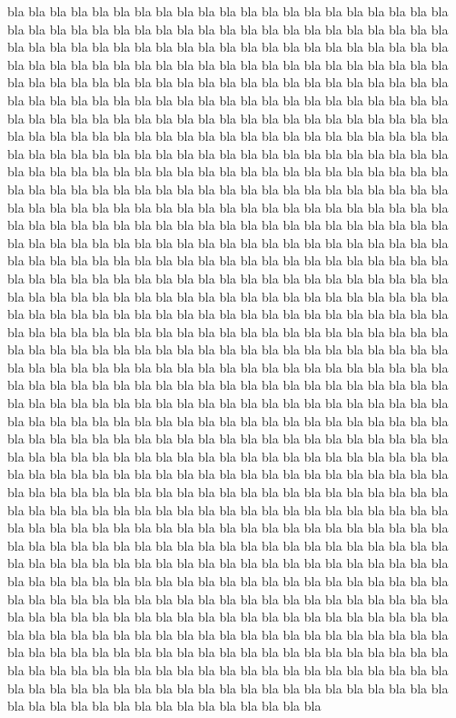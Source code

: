 \documentclass[12pt]{book}%
\theoremstyle{newstyle}%
\begin{document}
bla bla bla bla bla bla bla bla bla bla bla bla bla bla bla bla bla bla bla bla bla bla bla bla bla bla bla bla bla bla bla bla bla bla bla bla bla bla bla bla bla bla bla bla bla bla bla bla bla bla bla bla bla bla bla bla bla bla bla bla bla bla bla bla bla bla bla bla bla bla bla bla bla bla bla bla bla bla bla bla bla bla bla bla bla bla bla bla bla bla bla bla bla bla bla bla bla bla bla bla bla bla bla bla bla bla bla bla bla bla bla bla bla bla bla bla bla bla bla bla bla bla bla bla bla bla bla bla bla bla bla bla bla bla bla bla bla bla bla bla bla bla bla bla bla bla bla bla bla bla bla bla bla bla bla bla bla bla bla bla bla bla bla bla bla bla bla bla bla bla bla bla bla bla bla bla bla bla bla bla bla bla bla bla bla bla bla bla bla bla bla bla bla bla bla bla bla bla bla bla bla bla bla bla bla bla bla bla bla bla bla bla bla bla bla bla bla bla bla bla bla bla bla bla bla bla bla bla bla bla bla bla bla bla bla bla bla bla bla bla bla bla bla bla bla bla bla bla bla bla bla bla bla bla bla bla bla bla bla bla bla bla bla bla bla bla bla bla bla bla bla bla bla bla bla bla bla bla bla bla bla bla bla bla bla bla bla bla bla bla bla bla bla bla bla bla bla bla bla bla bla bla bla bla bla bla bla bla bla bla bla bla bla bla bla bla bla bla bla bla bla bla bla bla bla bla bla bla bla bla bla bla bla bla bla bla bla bla bla bla bla bla bla bla bla bla bla bla bla bla bla bla bla bla bla bla bla bla bla bla bla bla bla bla bla bla bla bla bla bla bla bla bla bla bla bla bla bla bla bla bla bla bla bla bla bla bla bla bla bla bla bla bla bla bla bla bla bla bla bla bla bla bla bla bla bla bla bla bla bla bla bla bla bla bla bla bla bla bla bla bla bla bla bla bla bla bla bla bla bla bla bla bla bla bla bla bla bla bla bla bla bla bla bla bla bla bla bla bla bla bla bla bla bla bla bla bla bla bla bla bla bla bla bla bla bla bla bla bla bla bla bla bla bla bla bla bla bla bla bla bla bla bla bla bla bla bla bla bla bla bla bla bla bla bla bla bla bla bla bla bla bla bla bla bla bla bla bla bla bla bla bla bla bla bla bla bla bla bla bla bla bla bla bla bla bla bla bla bla bla bla bla bla bla bla bla bla bla bla bla bla bla bla bla bla bla bla bla bla bla bla bla bla bla bla bla bla bla bla bla bla bla bla bla bla bla bla bla bla bla bla bla bla bla bla bla bla bla bla bla bla bla bla bla bla bla bla bla bla bla bla bla bla bla bla bla bla bla bla bla bla bla bla bla bla bla bla bla bla bla bla bla bla bla bla bla bla bla bla bla bla bla bla bla bla bla bla bla bla bla bla bla bla bla bla bla bla bla bla bla bla bla bla bla bla bla bla bla bla bla bla bla bla bla bla bla bla bla bla bla bla bla bla bla bla bla bla bla bla bla bla bla bla bla bla bla bla bla bla bla bla bla bla bla bla bla bla bla bla bla bla bla bla bla bla bla bla bla bla bla bla bla bla bla bla bla bla bla bla bla bla bla bla bla bla bla bla bla bla bla bla bla bla bla bla bla bla bla bla bla bla bla bla bla bla bla bla bla bla bla bla bla bla bla bla bla bla bla bla bla bla bla bla bla bla bla bla bla bla bla bla bla bla bla bla bla bla bla bla bla bla bla bla bla bla bla bla bla bla bla bla bla bla bla bla bla bla bla bla bla bla bla bla bla bla bla bla bla bla bla bla bla bla bla bla bla bla bla bla bla bla bla bla bla bla bla bla bla bla bla bla bla bla bla bla bla bla bla bla bla bla bla bla bla 
\end{document}
